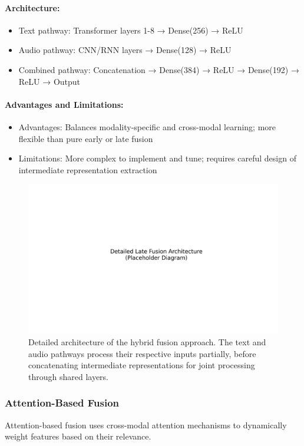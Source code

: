 \documentclass[12pt]{article}
\begin{document}
\paragraph{Architecture:}
\begin{itemize}
    \item Text pathway: Transformer layers 1-8 → Dense(256) → ReLU
    \item Audio pathway: CNN/RNN layers → Dense(128) → ReLU
    \item Combined pathway: Concatenation → Dense(384) → ReLU → Dense(192) → ReLU → Output
\end{itemize}

\paragraph{Advantages and Limitations:}
\begin{itemize}
    \item Advantages: Balances modality-specific and cross-modal learning; more flexible than pure early or late fusion
    \item Limitations: More complex to implement and tune; requires careful design of intermediate representation extraction
\end{itemize}

\begin{figure}[h]
    \centering
    \includegraphics[width=0.9\linewidth]{Figures/DetailLateFusion.png}
    \caption{Detailed architecture of the hybrid fusion approach. The text and audio pathways process their respective inputs partially, before concatenating intermediate representations for joint processing through shared layers.}
    \label{fig:hybrid_fusion}
\end{figure}

\subsubsection{Attention-Based Fusion}
Attention-based fusion uses cross-modal attention mechanisms to dynamically weight features based on their relevance.
\end{document}
